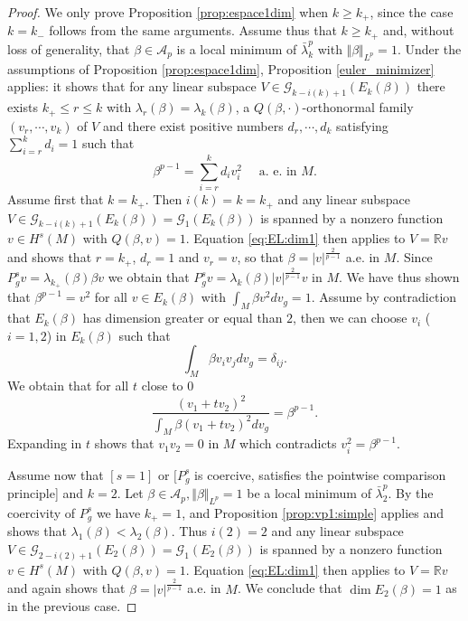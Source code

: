 \documentclass[10pt]{amsart}
\numberwithin{equation}{section}
\def\be{{\beta}}
\def\de{{\delta}}
\theoremstyle{plain}
\theoremstyle{remark}
\begin{document}
\begin{proof}
We only prove Proposition \ref{prop:espace1dim} when $k \ge k_+$, since the case $k = k_-$ follows from the same arguments. Assume thus that $k \ge k_+$ and, without loss of generality, that $\beta \in \mathcal{A}_p$ is a local minimum of $ \bar{\lambda}_k^p$ with $\Vert \beta \Vert_{L^p} = 1$. Under the assumptions of Proposition \ref{prop:espace1dim}, Proposition \ref{euler_minimizer} applies: it shows that for any linear subspace $V \in \mathcal{G}_{k-i(k)+1}(E_k(\beta))$ there exists $k_+ \le r \le k $ with $\lambda_r(\beta) = \lambda_k(\beta)$, a $Q(\beta,\cdot)$-orthonormal family $(v_{r},\cdots,v_k)$ of $V$ and there exist positive numbers $d_r,\cdots,d_k$ satisfying $\sum_{i=r}^k d_i = 1$ such that 
\begin{equation} \label{eq:EL:dim1}
  \beta^{p-1} = \sum_{i=r}^k d_i v_i^2 \quad \text{ a. e. in } M.
  \end{equation}
Assume first that $k = k_+$. Then $i(k) = k = k_+$ and any linear subspace $V \in \mathcal{G}_{k-i(k)+1}(E_k(\beta)) = \mathcal{G}_{1}(E_k(\beta))$ is spanned by a nonzero function $v \in H^s(M)$ with $Q(\beta, v) = 1$. Equation \eqref{eq:EL:dim1} then applies to $V = \mathbb{R}v$ and shows that $r = k_+$, $d_{r} =1$ and $v_r = v$, so that 
$\beta = |v|^{\frac{2}{p-1}}$ a.e. in $M$. Since $P_g^s v = \lambda_{k_+}(\beta) \beta v$ we obtain that $P_g^s v = \lambda_k(\beta) |v|^{\frac{2}{p-1}} v$ in $M$. 
We have thus shown that 
$\beta^{p-1} = v^2$ for all $v \in E_k(\beta)$ with $\int_M \beta v^2 dv_g=1$. Assume by contradiction that $E_k(\beta)$ has dimension greater or equal than $2$, then  we  can choose $v_i$ ($i=1,2$) in $E_{k}(\be)$ such that 
$$\int_M \beta v_i v_j dv_g = \de_{ij}.$$ 
We obtain that for all $t$ close to $0$ 
$$ \frac{(v_1+t v_2)^2}{ \int_M \beta  (v_1+t v_2)^2 dv_g} = \be^{p-1}.$$ 
Expanding in $t$ shows that $v_1v_2 = 0$ in $M$ which contradicts $v_i^2 = \beta^{p-1}$. 

\medskip

Assume now that $[s=1]$ or $[P_g^s$ is coercive, satisfies the pointwise comparison principle] and $k=2$. Let $\beta \in \mathcal{A}_p, \Vert \beta \Vert_{L^p} = 1$ be a local minimum of $ \bar{\lambda}_2^p$. By the coercivity of $P_g^s$ we have $k_+=1$, and  Proposition \ref{prop:vp1:simple} applies and  shows that $\lambda_1(\beta) < \lambda_2(\beta)$. Thus $i(2)=2$ and any linear subspace $V \in \mathcal{G}_{2-i(2)+1}(E_2(\beta)) = \mathcal{G}_{1}(E_2(\beta))$ is spanned by a nonzero function $v \in H^s(M)$ with $Q(\beta, v) = 1$. Equation \eqref{eq:EL:dim1} then applies to $V = \mathbb{R}v$ and again shows that $\beta = |v|^{\frac{2}{p-1}}$ a.e. in $M$. We conclude that $\dim E_2(\beta) = 1$ as in the previous case. 


\end{proof}
\end{document}
